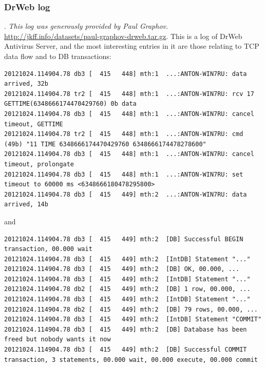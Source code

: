 \documentclass{article}
\begin{document}
\subsubsection{DrWeb log}. \emph{This log was generously provided by Paul Graphov.} \url{http://jkff.info/datasets/paul-graphov-drweb.tar.gz}. This is a log of DrWeb Antivirus Server, and the most interesting entries in it are those relating to TCP data flow and to DB transactions:

\begin{verbatim}
20121024.114904.78 db3 [  415   448] mth:1  ...:ANTON-WIN7RU: data arrived, 32b
20121024.114904.78 tr2 [  415   448] mth:1  ...:ANTON-WIN7RU: rcv 17 GETTIME(6348666174470429760) 0b data
20121024.114904.78 db3 [  415   448] mth:1  ...:ANTON-WIN7RU: cancel timeout, GETTIME
20121024.114904.78 tr2 [  415   448] mth:1  ...:ANTON-WIN7RU: cmd (49b) "11 TIME 6348666174470429760 6348666174478278600"
20121024.114904.78 db3 [  415   448] mth:1  ...:ANTON-WIN7RU: cancel timeout, prolongate
20121024.114904.78 db3 [  415   448] mth:1  ...:ANTON-WIN7RU: set timeout to 60000 ms <6348666180478295800>
20121024.114904.78 db3 [  415   449] mth:2  ...:ANTON-WIN7RU: data arrived, 14b
\end{verbatim}

and

\begin{verbatim}
20121024.114904.78 db3 [  415   449] mth:2  [DB] Successful BEGIN transaction, 00.000 wait
20121024.114904.78 db3 [  415   449] mth:2  [IntDB] Statement "..."
20121024.114904.78 db3 [  415   449] mth:2  [DB] OK, 00.000, ...
20121024.114904.78 db3 [  415   449] mth:2  [IntDB] Statement "..."
20121024.114904.78 db2 [  415   449] mth:2  [DB] 1 row, 00.000, ...
20121024.114904.78 db3 [  415   449] mth:2  [IntDB] Statement "..."
20121024.114904.78 db2 [  415   449] mth:2  [DB] 79 rows, 00.000, ...
20121024.114904.78 db3 [  415   449] mth:2  [IntDB] Statement "COMMIT"
20121024.114904.78 db3 [  415   449] mth:2  [DB] Database has been freed but nobody wants it now 
20121024.114904.78 db3 [  415   449] mth:2  [DB] Successful COMMIT transaction, 3 statements, 00.000 wait, 00.000 execute, 00.000 commit 
\end{verbatim}
\end{document}
